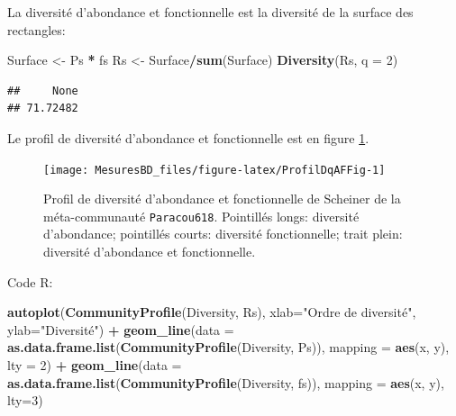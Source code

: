 \documentclass[
  11pt,
  french,
  a4paper,
  extrafontsizes,onecolumn,openright
  ]{memoir}
\newenvironment{Shaded}{\begin{snugshade}}{\end{snugshade}}
\newcommand{\AttributeTok}[1]{\textcolor[rgb]{0.13,0.29,0.53}{#1}}
\newcommand{\DecValTok}[1]{\textcolor[rgb]{0.00,0.00,0.81}{#1}}
\newcommand{\FunctionTok}[1]{\textcolor[rgb]{0.13,0.29,0.53}{\textbf{#1}}}
\newcommand{\NormalTok}[1]{#1}
\newcommand{\OtherTok}[1]{\textcolor[rgb]{0.56,0.35,0.01}{#1}}
\newcommand{\SpecialCharTok}[1]{\textcolor[rgb]{0.81,0.36,0.00}{\textbf{#1}}}
\newcommand{\StringTok}[1]{\textcolor[rgb]{0.31,0.60,0.02}{#1}}
\newlength{\rf}
\begin{document}
\normalsize

La diversité d'abondance et fonctionnelle est la diversité de la surface des rectangles:

\scriptsize

\begin{Shaded}
\begin{Highlighting}[]
\NormalTok{Surface }\OtherTok{\textless{}{-}}\NormalTok{ Ps }\SpecialCharTok{*}\NormalTok{ fs}
\NormalTok{Rs }\OtherTok{\textless{}{-}}\NormalTok{ Surface}\SpecialCharTok{/}\FunctionTok{sum}\NormalTok{(Surface)}
\FunctionTok{Diversity}\NormalTok{(Rs, }\AttributeTok{q =} \DecValTok{2}\NormalTok{)}
\end{Highlighting}
\end{Shaded}

\begin{verbatim}
##     None 
## 71.72482
\end{verbatim}

\normalsize

Le profil de diversité d'abondance et fonctionnelle est en figure \ref{fig:ProfilDqAFFig}.



\scriptsize

\begin{figure}

{\centering \texttt{[image: MesuresBD\_files/figure-latex/ProfilDqAFFig-1]} 

}

\caption{Profil de diversité d'abondance et fonctionnelle de Scheiner de la méta-communauté \texttt{Paracou618}. Pointillés longs: diversité d'abondance; pointillés courts: diversité fonctionnelle; trait plein: diversité d'abondance et fonctionnelle.}\label{fig:ProfilDqAFFig}
\end{figure}

\normalsize

Code R:

\scriptsize

\begin{Shaded}
\begin{Highlighting}[]
\FunctionTok{autoplot}\NormalTok{(}\FunctionTok{CommunityProfile}\NormalTok{(Diversity, Rs), }
         \AttributeTok{xlab=}\StringTok{"Ordre de diversité"}\NormalTok{, }\AttributeTok{ylab=}\StringTok{"Diversité"}\NormalTok{) }\SpecialCharTok{+}
\FunctionTok{geom\_line}\NormalTok{(}\AttributeTok{data =} \FunctionTok{as.data.frame.list}\NormalTok{(}\FunctionTok{CommunityProfile}\NormalTok{(Diversity, Ps)), }
          \AttributeTok{mapping =} \FunctionTok{aes}\NormalTok{(x, y), }\AttributeTok{lty =} \DecValTok{2}\NormalTok{) }\SpecialCharTok{+}
\FunctionTok{geom\_line}\NormalTok{(}\AttributeTok{data =} \FunctionTok{as.data.frame.list}\NormalTok{(}\FunctionTok{CommunityProfile}\NormalTok{(Diversity, fs)),}
          \AttributeTok{mapping =} \FunctionTok{aes}\NormalTok{(x, y), }\AttributeTok{lty=}\DecValTok{3}\NormalTok{)}
\end{Highlighting}
\end{Shaded}
\end{document}
